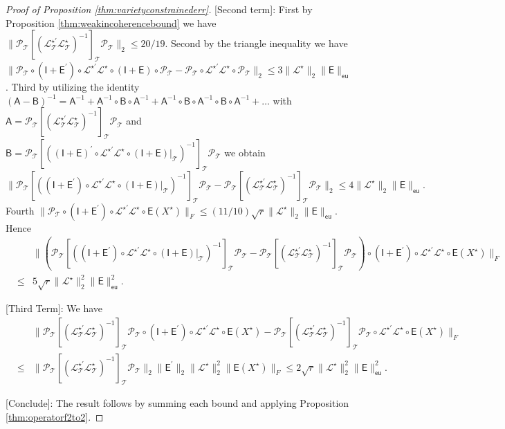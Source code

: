 \documentclass[11pt,letterpaper]{article}
\newcommand{\ct}{\mathcal{T}}
\newcommand{\cp}{\mathcal{P}}
\newcommand{\sfe}{\mathsf{E}}
\newcommand{\sfi}{\mathsf{I}}
\newcommand{\eu}{\mathsf{eu}}
\begin{document}
\begin{proof}[Proof of Proposition \ref{thm:varietyconstrainederr}]
	[Second term]:  First by Proposition \ref{thm:weakincoherencebound} we have $\|\cp_{\ct}[(\mathcal{L}^{\star\prime}_{\ct} \mathcal{L}^{\star}_{\ct} )^{-1}]_{\ct} \cp_{\ct} \|_2 \leq 20/19$.  Second by the triangle inequality we have $\| \cp_{\ct} \circ (\sfi+\sfe^{\prime}) \circ \mathcal{L}^{\star\prime} \mathcal{L}^{\star} \circ (\sfi+\sfe) \circ \cp_{\ct} - \cp_{\ct} \circ \mathcal{L}^{\star\prime} \mathcal{L}^{\star} \circ \cp_{\ct} \|_2 \leq 3 \|\mathcal{L}^{\star}\|_{2} \|\sfe\|_{\eu}$.  Third by utilizing the identity $(\mathsf{A} - \mathsf{B})^{-1} = \mathsf{A}^{-1} + \mathsf{A}^{-1} \circ \mathsf{B} \circ \mathsf{A}^{-1} + \mathsf{A}^{-1} \circ \mathsf{B} \circ \mathsf{A}^{-1} \circ \mathsf{B} \circ \mathsf{A}^{-1} + \ldots $ with $\mathsf{A} = \cp_{\ct} [(\mathcal{L}^{\star\prime}_{\ct} \mathcal{L}^{\star}_{\ct})^{-1}]_{\ct} \cp_{\ct}$ and $\mathsf{B} = \cp_{\ct} [((\sfi+\sfe)^{\prime} \circ \mathcal{L}^{\star\prime} \mathcal{L}^{\star} \circ (\sfi+\sfe)|_{\ct})^{-1}]_{\ct} \cp_{\ct}$ we obtain
	\begin{equation*}
		\| \cp_{\ct} [((\sfi+\sfe^{\prime}) \circ \mathcal{L}^{\star\prime} \mathcal{L}^{\star} \circ (\sfi+\sfe)|_{\ct} )^{-1}]_{\ct} \cp_{\ct} - \cp_{\ct} [(\mathcal{L}^{\star\prime}_{\ct} \mathcal{L}^{\star}_{\ct} )^{-1}]_{\ct} \cp_{\ct} \|_2 \leq 4 \|\mathcal{L}^{\star}\|_{2} \|\sfe\|_{\eu}.
	\end{equation*}
	Fourth $\|\cp_{\ct} \circ (\sfi+\sfe^{\prime}) \circ \mathcal{L}^{\star\prime} \mathcal{L}^{\star} \circ \sfe (X^{\star}) \|_F \leq (11/10) \sqrt{r} \|\mathcal{L}^{\star}\|_{2} \|\sfe\|_{\eu}$.  Hence
	\begin{eqnarray*}
		& & \| (\cp_{\ct} [((\sfi+\sfe^{\prime}) \circ \mathcal{L}^{\star\prime} \mathcal{L}^{\star} \circ (\sfi+\sfe)|_{\ct} )^{-1}]_{\ct} \cp_{\ct} - \cp_{\ct} [(\mathcal{L}^{\star\prime}_{\ct} \mathcal{L}^{\star}_{\ct} )^{-1}]_{\ct} \cp_{\ct} ) \circ (\sfi+\sfe^{\prime}) \circ \mathcal{L}^{\star\prime} \mathcal{L}^{\star} \circ \sfe (X^{\star}) \|_F \\
		& \leq & 5\sqrt{r} \|\mathcal{L}^{\star}\|_{2}^2 \|\sfe\|_{\eu}^2.
	\end{eqnarray*}
	
	[Third Term]:  We have
	\begin{eqnarray*}
		&& \| \cp_{\ct} [(\mathcal{L}^{\star\prime}_{\ct} \mathcal{L}^{\star}_{\ct} )^{-1}]_{\ct} \cp_{\ct} \circ (\sfi+\sfe^{\prime}) \circ \mathcal{L}^{\star\prime} \mathcal{L}^{\star} \circ \sfe (X^{\star}) - \cp_{\ct} [(\mathcal{L}^{\star\prime}_{\ct} \mathcal{L}^{\star}_{\ct} )^{-1}]_{\ct} \cp_{\ct} \circ \mathcal{L}^{\star\prime} \mathcal{L}^{\star} \circ \sfe (X^{\star}) \|_F \\
		& \leq & \| \cp_{\ct} [(\mathcal{L}^{\star\prime}_{\ct} \mathcal{L}^{\star}_{\ct} )^{-1}]_{\ct} \cp_{\ct} \|_2 \|\sfe^{\prime}\|_{2} \|\mathcal{L}^{\star}\|_{2}^2 \|\sfe(X^{\star})\|_F \leq 2 \sqrt{r} \|\mathcal{L}^{\star}\|_{2}^2 \|\sfe\|_{\eu}^2.
	\end{eqnarray*}
	
	[Conclude]:  The result follows by summing each bound and applying Proposition \ref{thm:operatorf2to2}.
\end{proof}
\end{document}
